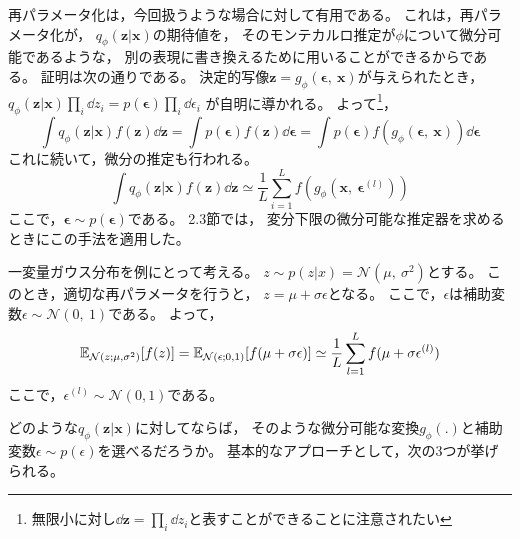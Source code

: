 \documentclass[dvipdfmx, fleqn, draft]{jsarticle}
\begin{document}
再パラメータ化は，今回扱うような場合に対して有用である。
これは，再パラメータ化が，
\(q_{\phi} (\bm{z} | \bm{x})\)の期待値を，
そのモンテカルロ推定が\(\phi\)について微分可能であるような，
別の表現に書き換えるために用いることができるからである。
証明は次の通りである。
決定的写像\(\bm{z} = g_{\phi} (\bm{\epsilon},\ \bm{x})\)が与えられたとき，
\(q_{\phi} (\bm{z} | \bm{x}) \prod_{i} \dd{z_i} = p(\bm{\epsilon}) \prod_{i} \dd{\epsilon_i}\)
が自明に導かれる。
よって\footnote{無限小に対し\(\dd{\bm{z}} = \prod_{i} \dd{z_i}\)と表すことができることに注意されたい}，
\begin{equation*}
    \int q_{\phi} (\bm{z} | \bm{x}) f(\bm{z}) \dd{\bm{z}}
        = \int p(\bm{\epsilon}) f(\bm{z}) \dd{\bm{\epsilon}}
        = \int p(\bm{\epsilon}) f(g_{\phi} (\bm{\epsilon},\ \bm{x})) \dd{\bm{\epsilon}}
\end{equation*}
これに続いて，微分の推定も行われる。
\begin{equation*}
    \int q_{\phi} (\bm{z} | \bm{x}) f(\bm{z}) \dd{\bm{z}}
        \simeq \frac{1}{L} \sum_{i=1}^{L} f(g_{\phi} (\bm{x},\ \bm{\epsilon}^{(l)}))
\end{equation*}
ここで，\(\bm{\epsilon} \sim p(\bm{\epsilon})\)である。
2.3節では，
変分下限の微分可能な推定器を求めるときにこの手法を適用した。

一変量ガウス分布を例にとって考える。
\(z \sim p(z|x) = \mathcal{N}(\mu,\ \sigma^2)\)とする。
このとき，適切な再パラメータを行うと，
\(z = \mu + \sigma \epsilon\)となる。
ここで，\(\epsilon\)は補助変数\(\epsilon \sim \mathcal{N} (0,\ 1)\)である。
よって，
\begin{equation*}
    \mathbb{E}_{\mathcal{N}(z; \mu, \sigma^2)} \qty[f(z)]
        = \mathbb{E}_{\mathcal{N}(\epsilon; 0, 1)} \qty[f(\mu + \sigma \epsilon)]
        \simeq \frac{1}{L} \sum_{l=1}^{L} f(\mu + \sigma \epsilon^{(l)})
\end{equation*}
ここで，\(\epsilon^{(l)} \sim \mathcal{N}(0, 1)\)である。

どのような\(q_{\phi} (\bm{z} | \bm{x})\)に対してならば，
そのような微分可能な変換\(g_{\phi} (.)\)と補助変数\(\epsilon \sim p(\epsilon)\)を選べるだろうか。
基本的なアプローチとして，次の3つが挙げられる。
\end{document}
